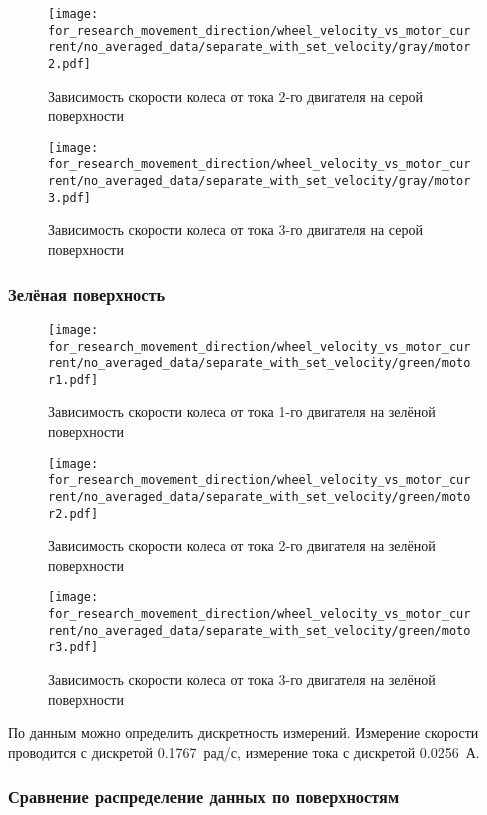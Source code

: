 \begin{figure}[H]
    \centering
    \texttt{[image: for\_research\_movement\_direction/wheel\_velocity\_vs\_motor\_current/no\_averaged\_data/separate\_with\_set\_velocity/gray/motor2.pdf]}
    \caption{Зависимость скорости колеса от тока 2-го двигателя на серой поверхности}
\end{figure}

\begin{figure}[H]
    \centering
    \texttt{[image: for\_research\_movement\_direction/wheel\_velocity\_vs\_motor\_current/no\_averaged\_data/separate\_with\_set\_velocity/gray/motor3.pdf]}
    \caption{Зависимость скорости колеса от тока 3-го двигателя на серой поверхности}
\end{figure}

\subsubsection{Зелёная поверхность}

\begin{figure}[H]
    \centering
    \texttt{[image: for\_research\_movement\_direction/wheel\_velocity\_vs\_motor\_current/no\_averaged\_data/separate\_with\_set\_velocity/green/motor1.pdf]}
    \caption{Зависимость скорости колеса от тока 1-го двигателя на зелёной поверхности}
\end{figure}

\begin{figure}[H]
    \centering
    \texttt{[image: for\_research\_movement\_direction/wheel\_velocity\_vs\_motor\_current/no\_averaged\_data/separate\_with\_set\_velocity/green/motor2.pdf]}
    \caption{Зависимость скорости колеса от тока 2-го двигателя на зелёной поверхности}
\end{figure}

\begin{figure}[H]
    \centering
    \texttt{[image: for\_research\_movement\_direction/wheel\_velocity\_vs\_motor\_current/no\_averaged\_data/separate\_with\_set\_velocity/green/motor3.pdf]}
    \caption{Зависимость скорости колеса от тока 3-го двигателя на зелёной поверхности}
\end{figure}

По данным можно определить дискретность измерений. Измерение скорости проводится с дискретой \qty{0.1767}{рад/с}, измерение тока с дискретой \qty{0.0256}{А}.

\subsubsection{Сравнение распределение данных по поверхностям}

